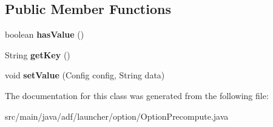 \subsection*{Public Member Functions}
\begin{DoxyCompactItemize}
\item 
\hypertarget{classadf_1_1launcher_1_1option_1_1OptionPrecompute_ac5b62385c48c8b96a7b5a9d49b32e3ef}{}\label{classadf_1_1launcher_1_1option_1_1OptionPrecompute_ac5b62385c48c8b96a7b5a9d49b32e3ef} 
boolean {\bfseries has\+Value} ()
\item 
\hypertarget{classadf_1_1launcher_1_1option_1_1OptionPrecompute_ac729fb7a757263da3832e59f7807c9f1}{}\label{classadf_1_1launcher_1_1option_1_1OptionPrecompute_ac729fb7a757263da3832e59f7807c9f1} 
String {\bfseries get\+Key} ()
\item 
\hypertarget{classadf_1_1launcher_1_1option_1_1OptionPrecompute_ad7c65958b80a73307c170d07c2ab1c05}{}\label{classadf_1_1launcher_1_1option_1_1OptionPrecompute_ad7c65958b80a73307c170d07c2ab1c05} 
void {\bfseries set\+Value} (Config config, String data)
\end{DoxyCompactItemize}


The documentation for this class was generated from the following file\+:\begin{DoxyCompactItemize}
\item 
src/main/java/adf/launcher/option/Option\+Precompute.\+java\end{DoxyCompactItemize}

